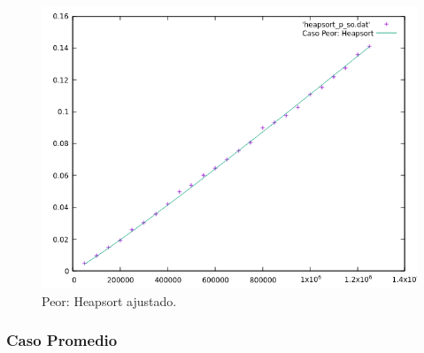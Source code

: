 \documentclass[a4paper,12pt,twoside]{article} %
\begin{document}
\begin{itemize}
\begin{figure}[h]
\begin{center}
  	\includegraphics[scale=0.8]{heapsort_p_so_a.png}
  	\caption{Peor: Heapsort ajustado.}
  	
  \end{center}
\end{figure}
		
	\end{itemize}
\newpage
	
	\subsubsection{Caso Promedio}
	
\end{document}
